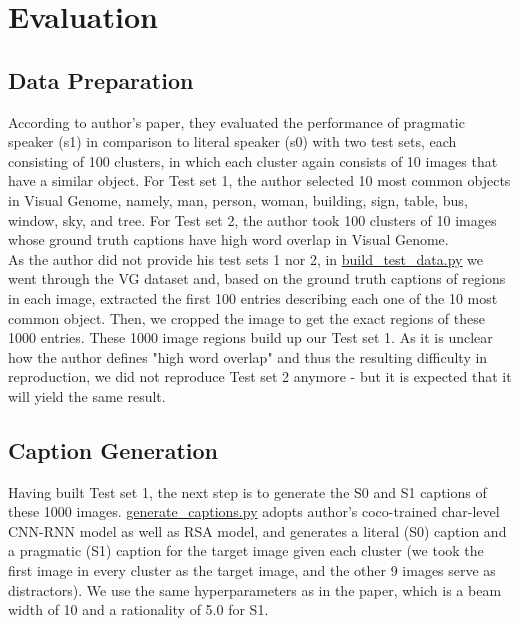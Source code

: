 \documentclass[a4paper]{scrartcl}
\begin{document}
\section*{Evaluation}
\subsection*{Data Preparation}
According to author's paper, they evaluated the performance of pragmatic speaker (s1) in comparison to literal speaker (s0) with two test sets, each consisting of 100 clusters, in which each cluster again consists of 10 images that have a similar object. For Test set 1, the author selected 10 most common objects in Visual Genome, namely, man, person, woman, building, sign, table, bus, window, sky, and tree. For Test set 2, the author took 100 clusters of 10 images whose ground truth captions have high word overlap in Visual Genome.\\

As the author did not provide his test sets 1 nor 2, in \href{https://github.com/Meng3www/PPlusPlus/blob/main/evaluate/build\_test\_data.py}{build\_test\_data.py} we went through the VG dataset and, based on the ground truth captions of regions in each image, extracted the first 100 entries describing each one of the 10 most common object. Then, we cropped the image to get the exact regions of these 1000 entries. These 1000 image regions build up our Test set 1. As it is unclear how the author defines "high word overlap" and thus the resulting difficulty in reproduction, we did not reproduce Test set 2 anymore - but it is expected that it will yield the same result.\\

\subsection*{Caption Generation}
Having built Test set 1, the next step is to generate the S0 and S1 captions of these 1000 images. \href{https://github.com/Meng3www/PPlusPlus/blob/main/evaluate/generate\_captions.py}{generate\_captions.py} adopts author's coco-trained char-level CNN-RNN model as well as RSA model, and generates a literal (S0) caption and a pragmatic (S1) caption for the target image given each cluster (we took the first image in every cluster as the target image, and the other 9 images serve as distractors). We use the same hyperparameters as in the paper, which is a beam width of 10 and a rationality of 5.0 for S1.\\
\end{document}

